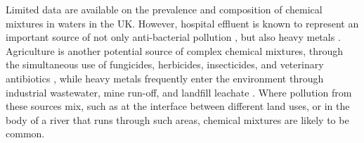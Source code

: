\documentclass[10pt]{article}
\begin{document}
Limited data are available on the prevalence and composition of chemical mixtures in waters in the UK. However, hospital effluent is known to represent an important source of not only anti-bacterial pollution \cite{Sacher2001}, but also heavy metals \cite{Verlicchi2010}. Agriculture is another potential source of complex chemical mixtures, through the simultaneous use of fungicides, herbicides, insecticides, and veterinary antibiotics \cite{Stuart2012}, while heavy metals frequently enter the environment through industrial wastewater, mine run-off, and landfill leachate \cite{Facchinelli2001}. Where pollution from these sources mix, such as at the interface between different land uses, or in the body of a river that runs through such areas, chemical mixtures are likely to be common.

\end{document}
